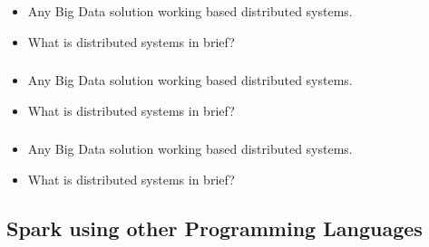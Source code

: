\begin{frame}
  \frametitle{\subsecname}
	\begin{itemize}[<+->]
		\item Any Big Data solution working based distributed systems.
		\item What is distributed systems in brief?
	\end{itemize}
\end{frame}




\begin{frame}
  \frametitle{\subsecname}
	\begin{itemize}[<+->]
		\item Any Big Data solution working based distributed systems.
		\item What is distributed systems in brief?
	\end{itemize}
\end{frame}




\begin{frame}
  \frametitle{\subsecname}
	\begin{itemize}[<+->]
		\item Any Big Data solution working based distributed systems.
		\item What is distributed systems in brief?
	\end{itemize}
\end{frame}


\subsection{Spark using other Programming Languages}

